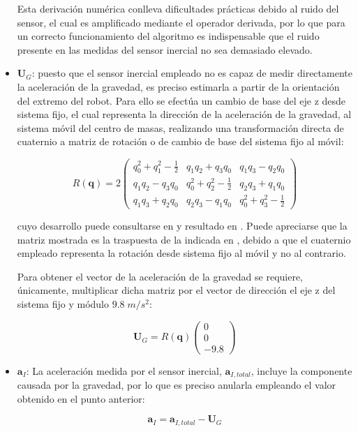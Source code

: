 \begin{itemize}
Esta derivación numérica conlleva dificultades prácticas debido al ruido del sensor, el cual es amplificado mediante el operador derivada, por lo que para un correcto funcionamiento del algoritmo es indispensable que el ruido presente en las medidas del sensor inercial no sea demasiado elevado.

\item $\boldsymbol{U}_G$: puesto que el sensor inercial empleado no es capaz de medir directamente la aceleración de la gravedad, es preciso estimarla a partir de la orientación del extremo del robot. Para ello se efectúa un cambio de base del eje z desde sistema fijo, el cual representa la dirección de la aceleración de la gravedad, al sistema móvil del centro de masas, realizando una transformación directa de cuaternio a matriz de rotación o de cambio de base del sistema fijo al móvil:

\[
	R(\boldsymbol{q}) = 
	2 \begin{pmatrix}
		q_0^2 + q_1^2 - \frac{1}{2} & q_1q_2 + q_3q_0 & q_1q_3 - q_2q_0 \\
		q_1q_2 - q_3q_0 & q_0^2 + q_2^2 - \frac{1}{2} & q_2q_3 + q_1q_0 \\
		q_1q_3 + q_2q_0 & q_2q_3 - q_1q_0 & q_0^2 + q_3^2 - \frac{1}{2}
	\end{pmatrix}
\]

cuyo desarrollo puede consultarse en \cite{beggs1983kinematics} y resultado en \cite{barrientos2007fundamentos}. Puede apreciarse que la matriz mostrada es la traspuesta de la indicada en \cite{barrientos2007fundamentos}, debido a que el cuaternio empleado representa la rotación desde sistema fijo al móvil y no al contrario. \par 

Para obtener el vector de la aceleración de la gravedad se requiere, únicamente, multiplicar dicha matriz por el vector de dirección el eje z del sistema fijo y módulo $9.8 \; m/s^2$:

\[
	\boldsymbol{U}_G = R(\boldsymbol{q}) 
		\begin{pmatrix}	0 \\ 0 \\ -9.8 \end{pmatrix}
\]

\item $\boldsymbol{a}_I$: La aceleración medida por el sensor inercial, $\boldsymbol{a}_{I,total}$, incluye la componente causada por la gravedad, por lo que es preciso anularla empleando el valor obtenido en el punto anterior:

\[ \boldsymbol{a}_I = \boldsymbol{a}_{I,total} - \boldsymbol{U}_G \]

\end{itemize}